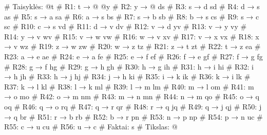 \begin{pythonaienv}[fc]
# Taisyklės:
@t             # R1: t → @
@y             # R2: y → @
ds             # R3: s → d
sd             # R4: d → s
as             # R5: s → a
sa             # R6: a → s
bs             # R7: s → b
sb             # R8: b → s
cs             # R9: s → c
sc             # R10: c → s
vd             # R11: d → v
dv             # R12: v → d
yv             # R13: v → y
vy             # R14: y → v
wv             # R15: v → w
vw             # R16: w → v
xv             # R17: v → x
vx             # R18: x → v
wz             # R19: z → w
zw             # R20: w → z
tz             # R21: z → t
zt             # R22: t → z
ea             # R23: a → e
ae             # R24: e → a
fe             # R25: e → f
ef             # R26: f → e
gf             # R27: f → g
fg             # R28: g → f
hg             # R29: g → h
gh             # R30: h → g
ih             # R31: h → i
hi             # R32: i → h
jh             # R33: h → j
hj             # R34: j → h
ki             # R35: i → k
ik             # R36: k → i
lk             # R37: k → l
kl             # R38: l → k
ml             # R39: l → m
lm             # R40: m → l
om             # R41: m → o
mo             # R42: o → m
nm             # R43: m → n
mn             # R44: n → m
qo             # R45: o → q
oq             # R46: q → o
rq             # R47: q → r
qr             # R48: r → q
jq             # R49: q → j
qj             # R50: j → q
br             # R51: r → b
rb             # R52: b → r
pn             # R53: n → p
np             # R54: p → n
uc             # R55: c → u
cu             # R56: u → c
# Faktai:
s
# Tikslas:
@
\end{pythonaienv}
